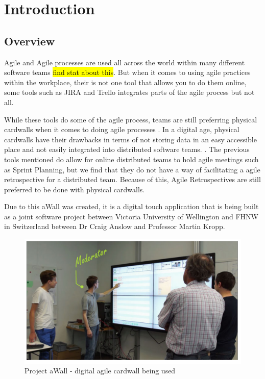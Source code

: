 \chapter{Introduction}\label{C:intro}
\section{Overview}
Agile and Agile processes are used all across the world within many different software teams \hl{find stat about this}. But when it comes to using agile practices within the workplace, their is not one tool that allows you to do them online, some tools such as JIRA \cite{jira} and Trello \cite{trello} integrates parts of the agile process but not all. 

While these tools do some of the agile process, teams are still preferring physical cardwalls when it comes to doing agile processes \cite{DBLP:conf/agiledc/GossageBB15, 6005503}. In a digital age, physical cardwalls have their drawbacks in terms of not storing data in an easy accessible place and not easily integrated into distributed software teams. \cite{xp2017_aWall}. The previous tools mentioned \cite{jira,trello} do allow for online distributed teams to hold agile meetings such as Sprint Planning, but we find that they do not have a way of facilitating a agile retrospective for a distributed team. Because of this, Agile Retrospectives are still preferred to be done with physical cardwalls. 

Due to this aWall was created, it is a digital touch application that is being built as a joint software project between Victoria University of Wellington and FHNW in Switzerland between Dr Craig Anslow and Professor Martin Kropp.

\begin{figure}[ht]
\centering
\includegraphics[width=0.85\columnwidth]{aWall_introduction}
\caption{Project aWall - digital agile cardwall being used}
\end{figure}

